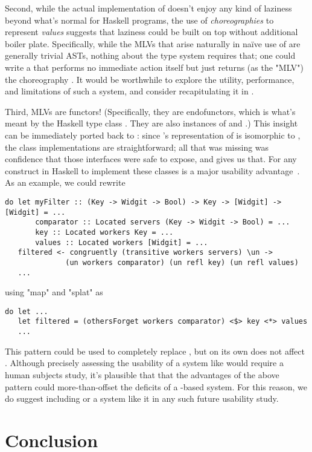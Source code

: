 Second, while the actual implementation of \minichor doesn't enjoy any kind of laziness beyond what's normal for Haskell programs,
the use of \emph{choreographies} to represent \emph{values} suggests that laziness could be built on top without additional boiler plate.
Specifically, while the MLVs that arise naturally in naïve use of \minichor are generally trivial  ASTs,
nothing about the type system requires that;
one could write a  that performs no immediate action itself but just returns
(as the "MLV") the choreography .
It would be worthwhile to explore the utility, performance, and limitations of such a system,
and consider recapitulating it in \MultiChor.

Third, MLVs are functors!
(Specifically, they are endofunctors, which is what's meant by the Haskell type class .
They are also instances of  and .)
This insight can be immediately ported back to \MultiChor:
since \MultiChor's representation of  is isomorphic to ,
the class implementations are straightforward;
all that was missing was confidence that those interfaces were safe to expose, and \minichor gives us that.
For any construct in Haskell to implement these classes is a major usability advantage~\cite[Chapter~4]{haskell-cookbook}.
As an example, we could rewrite
\begin{verbatim}
do let myFilter :: (Key -> Widgit -> Bool) -> Key -> [Widgit] -> [Widgit] = ...
       comparator :: Located servers (Key -> Widgit -> Bool) = ...
       key :: Located workers Key = ...
       values :: Located workers [Widgit] = ...
   filtered <- congruently (transitive workers servers) \un ->
              (un workers comparator) (un refl key) (un refl values)
   ...
\end{verbatim}
using "map" and "splat" as
\begin{verbatim}
do let ...
   let filtered = (othersForget workers comparator) <$> key <*> values
   ...
\end{verbatim}
This pattern could be used to completely replace ,
but on its own does not affect .
Although precisely assessing the usability of a system like \MultiChor would require a human subjects study,
it's plausible that that the advantages of the above pattern could more-than-offset the deficits of a -based system.
For this reason, we do suggest including \minichor or a system like it in any such future usability study.


\section{Conclusion}
\label{sec:conclusion}




